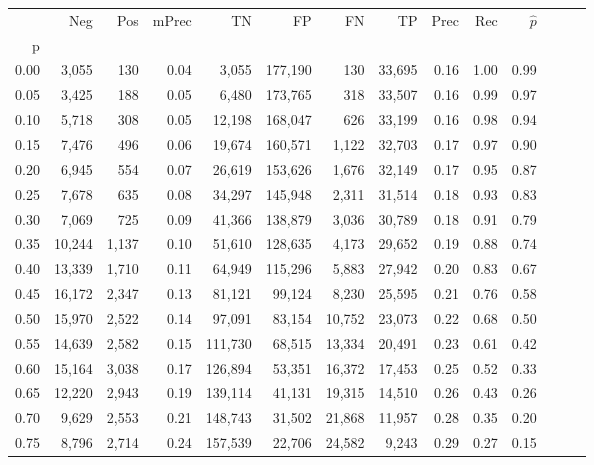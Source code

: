 \begin{tabular}{rrrrrrrrrrrrrr}
\toprule
{} &     Neg &    Pos & mPrec &       TN &       FP &      FN &      TP &  Prec &   Rec & $\hat{p}$ \\
p    &         &        &       &          &          &         &         &       &       &           \\
\midrule
0.00 &   3,055 &    130 &  0.04 &    3,055 &  177,190 &     130 &  33,695 &  0.16 &  1.00 &      0.99 \\
0.05 &   3,425 &    188 &  0.05 &    6,480 &  173,765 &     318 &  33,507 &  0.16 &  0.99 &      0.97 \\
0.10 &   5,718 &    308 &  0.05 &   12,198 &  168,047 &     626 &  33,199 &  0.16 &  0.98 &      0.94 \\
0.15 &   7,476 &    496 &  0.06 &   19,674 &  160,571 &   1,122 &  32,703 &  0.17 &  0.97 &      0.90 \\
0.20 &   6,945 &    554 &  0.07 &   26,619 &  153,626 &   1,676 &  32,149 &  0.17 &  0.95 &      0.87 \\
0.25 &   7,678 &    635 &  0.08 &   34,297 &  145,948 &   2,311 &  31,514 &  0.18 &  0.93 &      0.83 \\
0.30 &   7,069 &    725 &  0.09 &   41,366 &  138,879 &   3,036 &  30,789 &  0.18 &  0.91 &      0.79 \\
0.35 &  10,244 &  1,137 &  0.10 &   51,610 &  128,635 &   4,173 &  29,652 &  0.19 &  0.88 &      0.74 \\
0.40 &  13,339 &  1,710 &  0.11 &   64,949 &  115,296 &   5,883 &  27,942 &  0.20 &  0.83 &      0.67 \\
0.45 &  16,172 &  2,347 &  0.13 &   81,121 &   99,124 &   8,230 &  25,595 &  0.21 &  0.76 &      0.58 \\
0.50 &  15,970 &  2,522 &  0.14 &   97,091 &   83,154 &  10,752 &  23,073 &  0.22 &  0.68 &      0.50 \\
0.55 &  14,639 &  2,582 &  0.15 &  111,730 &   68,515 &  13,334 &  20,491 &  0.23 &  0.61 &      0.42 \\
0.60 &  15,164 &  3,038 &  0.17 &  126,894 &   53,351 &  16,372 &  17,453 &  0.25 &  0.52 &      0.33 \\
0.65 &  12,220 &  2,943 &  0.19 &  139,114 &   41,131 &  19,315 &  14,510 &  0.26 &  0.43 &      0.26 \\
0.70 &   9,629 &  2,553 &  0.21 &  148,743 &   31,502 &  21,868 &  11,957 &  0.28 &  0.35 &      0.20 \\
0.75 &   8,796 &  2,714 &  0.24 &  157,539 &   22,706 &  24,582 &   9,243 &  0.29 &  0.27 &      0.15 \\

\end{tabular}
